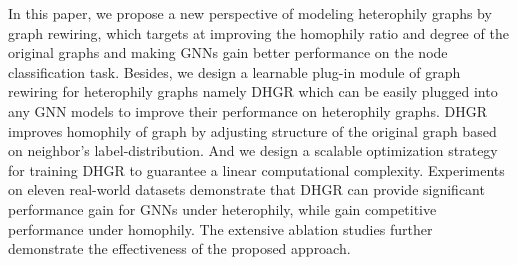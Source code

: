 \documentclass[sigconf]{acmart}
\begin{document}
In this paper, we propose a new perspective of modeling heterophily graphs by graph rewiring, which targets at improving the homophily ratio and degree of the original graphs and making GNNs gain better performance on the node classification task. Besides, we design a learnable plug-in module  of graph rewiring  for heterophily graphs namely DHGR which can be easily plugged into any GNN models to improve their performance on heterophily graphs. DHGR improves homophily of graph by adjusting structure of the original graph based on neighbor's label-distribution.  And we design a scalable optimization strategy for training DHGR  to guarantee a linear computational complexity. Experiments on eleven real-world datasets demonstrate that DHGR can provide significant performance gain for GNNs under heterophily, while gain competitive performance under homophily. The extensive ablation studies further demonstrate the effectiveness of the proposed approach. 
\balance

\appendix
\end{document}
